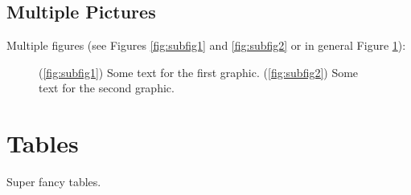 \documentclass[a4paper, 11pt]{scrreprt}
\begin{document}
\section{Multiple Pictures}
Multiple figures (see Figures \ref{fig:subfig1} and \ref{fig:subfig2} or in general Figure \ref{fig:subfigs}):
\begin{figure}[H]
  \centering
  \caption[Caption for multiple graphics in the list of figures]{(\ref{fig:subfig1}) Some text for the first graphic. (\ref{fig:subfig2}) Some text for the second graphic.}
  \label{fig:subfigs}
\end{figure}
\noindent
\chapter{Tables}
Super fancy tables.
\end{document}
